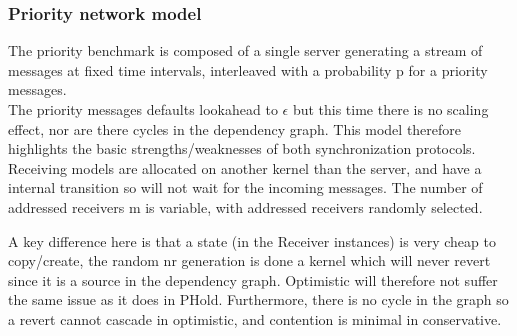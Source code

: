 \subsubsection{Priority network model}
The priority benchmark is composed of a single server generating a stream of messages at fixed time intervals, interleaved with a probability p for a priority messages. \\ The priority messages defaults lookahead to $\epsilon$ but this time there is no scaling effect, nor are there cycles in the dependency graph. This model therefore highlights the basic strengths/weaknesses of both synchronization protocols. Receiving models are allocated on another kernel than the server, and have a internal transition so will not wait for the incoming messages. The number of addressed receivers m is variable, with addressed receivers randomly selected.

% 
A key difference here is that a state (in the Receiver instances) is very cheap to copy/create, the random nr generation is done a kernel which will never revert since it is a source in the dependency graph. Optimistic will therefore not suffer the same issue as it does in PHold. Furthermore, there is no cycle in the graph so a revert cannot cascade in optimistic, and contention is minimal in conservative.

